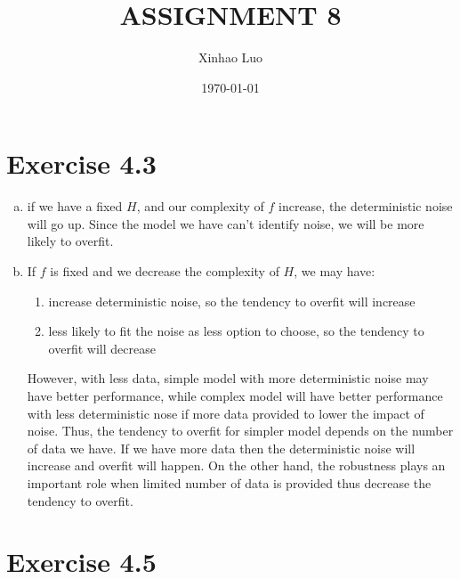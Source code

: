\documentclass{article}
\title{\bf \Large ASSIGNMENT 8}
\author{Xinhao Luo}
\date{\today}
\def\math#1{$#1$}
\begin{document}
\maketitle
\medskip

\section{Exercise 4.3}
\begin{enumerate}[a)]
    \item if we have a fixed \math{H}, and our complexity of \math{f} increase, the deterministic noise will go up. Since the model we have can't identify noise, we will be more likely to overfit.
    \item If \math{f} is fixed and we decrease the complexity of \math{H}, we may have:
        \begin{enumerate}
            \item increase deterministic noise, so the tendency to overfit will increase
            \item less likely to fit the noise as less option to choose, so the tendency to overfit will decrease
        \end{enumerate}
    However, with less data, simple model with more deterministic noise may have better performance, while complex model will have better performance with less deterministic nose if more data provided to lower the impact of noise. Thus, the tendency to overfit for simpler model depends on the number of data we have. If we have more data then the deterministic noise will increase and overfit will happen. On the other hand, the robustness plays an important role when limited number of data is provided thus decrease the tendency to overfit.
\end{enumerate}

\section{Exercise 4.5}
\end{document}

